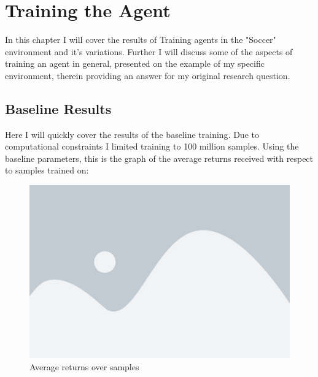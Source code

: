 \chapter{Training the Agent}\label{chap:training}
In this chapter I will cover the results of Training agents in the "Soccer" environment and it's variations. Further I will discuss some of the aspects of training an agent in general, presented on the example of my specific environment, therein providing an answer for my original research question.
\nolinebreak 
\section{Baseline Results}\label{sec:tr:baseline_results}
Here I will quickly cover the results of the baseline training. Due to computational constraints I limited training to 100 million samples. Using the baseline parameters, this is the graph of the average returns received with respect to samples trained on:

\begin{figure}[H]
    \centering
    \includegraphics[width=0.5\linewidth]{figures/placeholder.png}
    \caption{Average returns over samples}
    \label{fig:base_returns}
\end{figure}
\noindent

